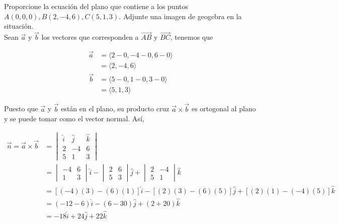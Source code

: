 \documentclass[12pt]{article}
\begin{document}
\section{}

Proporcione la ecuación del plano que contiene a los puntos $A(0,0,0) , B(2,-4,6), C(5,1,3)$. Adjunte una imagen de geogebra en la situación. \\

Sean $\vec{a}$ y $\vec{b}$ los vectores que corresponden a $\vec{AB}$ y $\vec{BC}$, tenemos que

\begin{align*}
  \vec{a} &= \langle 2-0, -4-0, 6-0 \rangle \\
  &= \langle 2,-4,6 \rangle \\
  \vec{b} &= \langle 5-0, 1-0, 3-0 \rangle \\
  &= \langle 5,1,3 \rangle
\end{align*}

Puesto que $\vec{a}$ y $\vec{b}$ están en el plano, su producto cruz $\vec{a} \times \vec{b}$ es ortogonal al plano y se puede tomar como el vector normal. Así,

\begin{equation*}
  \begin{split}
    \vec{n} = \vec{a} \times \vec{b}
    &= 
    \begin{vmatrix}
      \hat{i} & \hat{j} & \hat{k} \\
      2 & -4 & 6 \\
      5 & 1 & 3
    \end{vmatrix} \\
    &=
    \begin{vmatrix}
      -4 & 6 \\
      1 & 3
    \end{vmatrix}
    \hat{i}
    -
    \begin{vmatrix}
      2 & 6 \\
      5 & 3
    \end{vmatrix}
    \hat{j}
      +
      \begin{vmatrix}
        2 & -4 \\
        5 & 1
      \end{vmatrix}
      \hat{k}\\
      &=
      [(-4)(3)-(6)(1)]
      \hat{i}
      -
      [(2)(3)-(6)(5)]
      \hat{j}
      +
      [(2)(1)-(-4)(5)]
      \hat{k}\\
      &=
      (-12-6)\hat{i}
      -
      (6-30)\hat{j}
      +
      (2+20)\hat{k}\\
      &=
      -18\hat{i}
      +24\hat{j}
      +22\hat{k}
  \end{split}
\end{equation*}
\end{document}
